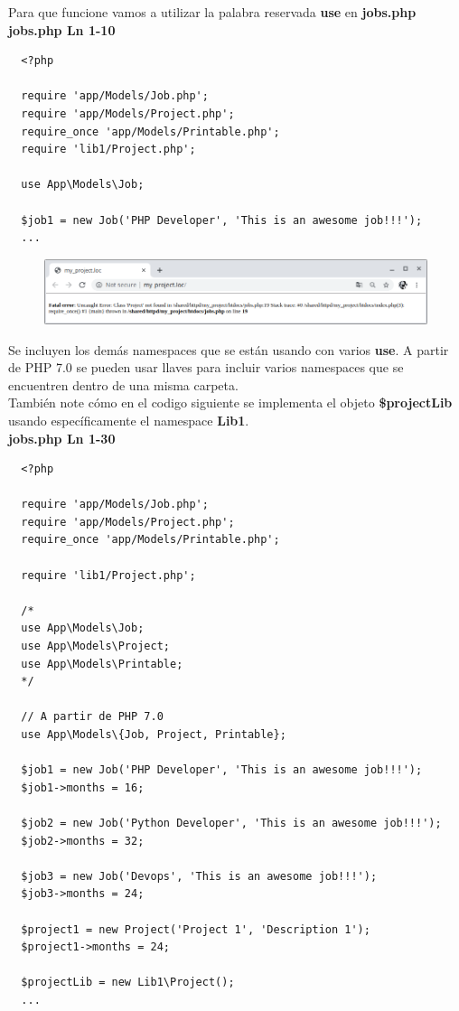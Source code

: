 \documentclass{article}
\begin{document}
Para que funcione vamos a utilizar la palabra reservada \textbf{use} en
\textbf{jobs.php}\\

\textbf{jobs.php Ln 1-10}
\begin{verbatim}
  <?php

  require 'app/Models/Job.php';
  require 'app/Models/Project.php';
  require_once 'app/Models/Printable.php';
  require 'lib1/Project.php';

  use App\Models\Job;

  $job1 = new Job('PHP Developer', 'This is an awesome job!!!');
  ...
\end{verbatim}

\begin{figure}[h!]
  \centering
  \includegraphics[scale=0.5]{./Pictures/053_namespaces.png}
\end{figure}

Se incluyen los demás namespaces que se están usando con varios \textbf{use}. A
partir de PHP 7.0 se pueden usar llaves para incluir varios namespaces que se
encuentren dentro de una misma carpeta.\\

También note cómo en el codigo siguiente se implementa el objeto
\textbf{\$projectLib} usando específicamente el namespace \textbf{Lib1}.\\

\textbf{jobs.php Ln 1-30}
\begin{verbatim}
  <?php

  require 'app/Models/Job.php';
  require 'app/Models/Project.php';
  require_once 'app/Models/Printable.php';

  require 'lib1/Project.php';

  /*
  use App\Models\Job;
  use App\Models\Project;
  use App\Models\Printable;
  */

  // A partir de PHP 7.0
  use App\Models\{Job, Project, Printable};

  $job1 = new Job('PHP Developer', 'This is an awesome job!!!');
  $job1->months = 16;

  $job2 = new Job('Python Developer', 'This is an awesome job!!!');
  $job2->months = 32;

  $job3 = new Job('Devops', 'This is an awesome job!!!');
  $job3->months = 24;

  $project1 = new Project('Project 1', 'Description 1');
  $project1->months = 24;

  $projectLib = new Lib1\Project();
  ...
\end{verbatim}
\end{document}
